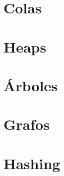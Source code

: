 \documentclass[titlepage,oneside]{book}
\begin{document}
\chapter{Colas}

\chapter{Heaps}

\chapter{Árboles}

\chapter{Grafos}

\chapter{Hashing}

\printbibliography{}
\end{document}
